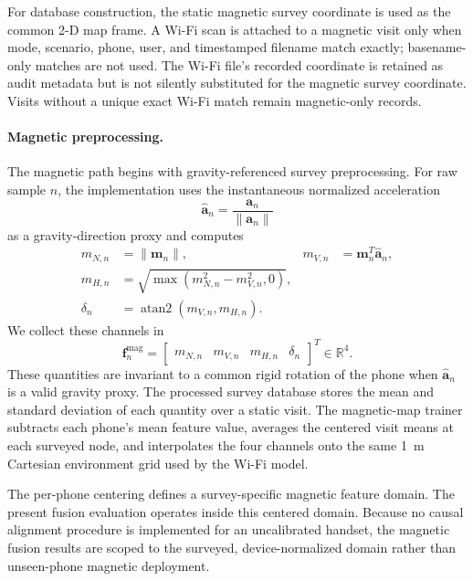\documentclass[conference]{IEEEtran}
\begin{document}
For database construction, the static magnetic survey coordinate is used as the common 2-D map frame. A Wi-Fi scan is attached to a magnetic visit only when mode, scenario, phone, user, and timestamped filename match exactly; basename-only matches are not used. The Wi-Fi file's recorded coordinate is retained as audit metadata but is not silently substituted for the magnetic survey coordinate. Visits without a unique exact Wi-Fi match remain magnetic-only records.

\paragraph{Magnetic preprocessing.}
The magnetic path begins with gravity-referenced survey preprocessing. For raw sample $n$, the implementation uses the instantaneous normalized acceleration
\begin{equation}
\hat{\mathbf{a}}_n=\frac{\mathbf{a}_n}{\|\mathbf{a}_n\|}
\label{eq:mag_gravity_proxy}
\end{equation}
as a gravity-direction proxy and computes
\begin{align}
m_{N,n} &= \|\mathbf{m}_n\|,
& m_{V,n} &= \mathbf{m}_n^T\hat{\mathbf{a}}_n,
\nonumber\\
m_{H,n} &= \sqrt{\max(m_{N,n}^2-m_{V,n}^2,0)},
\nonumber\\
\delta_n &= \operatorname{atan2}(m_{V,n},m_{H,n}).
\label{eq:mag_features}
\end{align}
We collect these channels in
\begin{equation}
\mathbf{f}^{\mathrm{mag}}_n=
\begin{bmatrix}m_{N,n}&m_{V,n}&m_{H,n}&\delta_n\end{bmatrix}^{T}
\in\mathbb{R}^{4}.
\label{eq:mag_feature_vector}
\end{equation}
These quantities are invariant to a common rigid rotation of the phone when $\hat{\mathbf{a}}_n$ is a valid gravity proxy. The processed survey database stores the mean and standard deviation of each quantity over a static visit. The magnetic-map trainer subtracts each phone's mean feature value, averages the centered visit means at each surveyed node, and interpolates the four channels onto the same 1~m Cartesian environment grid used by the Wi-Fi model.

The per-phone centering defines a survey-specific magnetic feature domain. The present fusion evaluation operates inside this centered domain. Because no causal alignment procedure is implemented for an uncalibrated handset, the magnetic fusion results are scoped to the surveyed, device-normalized domain rather than unseen-phone magnetic deployment.
\end{document}

